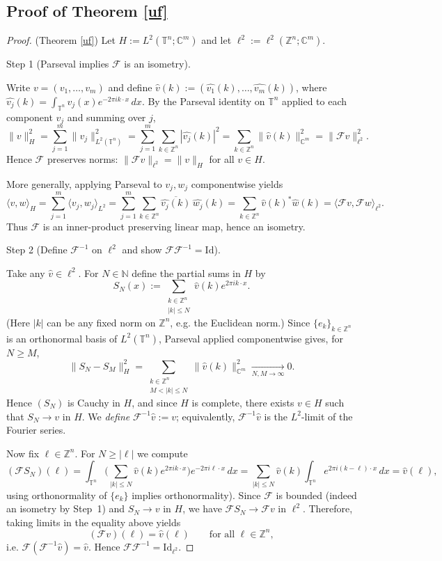 \documentclass{article}
\theoremstyle{plain}
\theoremstyle{definition}
\theoremstyle{remark}
\newcommand{\inner}[2]{\langle #1, #2 \rangle}
\newcommand{\F}{\mathcal{F}}
\newcommand{\Finve}{\mathcal{F}^{-1}}
\begin{document}
\subsection{Proof of Theorem \ref{uf}}
\begin{proof}(Theorem \ref{uf})
Let $H:=L^2(\mathbb{T}^n;\mathbb{C}^m)$ and let $\ell^2:=\ell^2(\mathbb{Z}^n;\mathbb{C}^m)$.

\medskip
Step 1 (Parseval implies $\F$ is an isometry).

Write $v=(v_1,\dots,v_m)$ and define $\hat v(k):=(\widehat{v_1}(k),\dots,\widehat{v_m}(k))$,
where $\widehat{v_j}(k)=\int_{\mathbb{T}^n} v_j(x)e^{-2\pi i k\cdot x}\,dx$.
By the Parseval identity on $\mathbb{T}^n$ applied to each component $v_j$ and summing over $j$,
\[
\|v\|_{H}^2
=\sum_{j=1}^m \|v_j\|_{L^2(\mathbb{T}^n)}^2
=\sum_{j=1}^m \sum_{k\in\mathbb{Z}^n} |\widehat{v_j}(k)|^2
=\sum_{k\in\mathbb{Z}^n}\|\hat v(k)\|_{\mathbb{C}^m}^2
=\|\F v\|_{\ell^2}^2.
\]
Hence $\F$ preserves norms: $\|\F v\|_{\ell^2}=\|v\|_{H}$ for all $v\in H$.

More generally, applying Parseval to $v_j,w_j$ componentwise yields
\[
\inner{v}{w}_{H}
=\sum_{j=1}^m \inner{v_j}{w_j}_{L^2}
=\sum_{j=1}^m\sum_{k\in\mathbb{Z}^n}\overline{\widehat{v_j}(k)}\,\widehat{w_j}(k)
=\sum_{k\in\mathbb{Z}^n}\hat v(k)^*\hat w(k)
=\inner{\F v}{\F w}_{\ell^2}.
\]
Thus $\F$ is an inner-product preserving linear map, hence an isometry.


Step 2 (Define $\Finve$ on $\ell^2$ and show $\F\Finve=\mathrm{Id}$).

Take any $\hat v\in \ell^2$. For $N\in\mathbb{N}$ define the partial sums in $H$ by
\[
S_N(x):=\sum_{\substack{k\in\mathbb{Z}^n\\ |k|\le N}}\hat v(k)e^{2\pi i k\cdot x}.
\]
(Here $|k|$ can be any fixed norm on $\mathbb{Z}^n$, e.g. the Euclidean norm.)
Since $\{e_k\}_{k\in\mathbb{Z}^n}$ is an orthonormal basis of $L^2(\mathbb{T}^n)$, Parseval applied componentwise gives, for $N\ge M$,
\[
\|S_N-S_M\|_{H}^2
=\sum_{\substack{k\in\mathbb{Z}^n\\ M<|k|\le N}}\|\hat v(k)\|_{\mathbb{C}^m}^2
\xrightarrow[N,M\to\infty]{}0.
\]
Hence $(S_N)$ is Cauchy in $H$, and since $H$ is complete, there exists $v\in H$ such that
$S_N\to v$ in $H$.
We \emph{define} $\Finve\hat v:=v$; equivalently, $\Finve\hat v$ is the $L^2$-limit of the Fourier series.

Now fix $\ell\in\mathbb{Z}^n$. For $N\ge |\ell|$ we compute
\[
(\F S_N)(\ell)
=\int_{\mathbb{T}^n}\Big(\sum_{|k|\le N}\hat v(k)e^{2\pi i k\cdot x}\Big)e^{-2\pi i \ell\cdot x}\,dx
=\sum_{|k|\le N}\hat v(k)\int_{\mathbb{T}^n}e^{2\pi i (k-\ell)\cdot x}\,dx
=\hat v(\ell),
\]
using orthonormality of $\{e_k\}$ implies orthonormality).
Since $\F$ is bounded (indeed an isometry by Step~1) and $S_N\to v$ in $H$, we have
$\F S_N\to \F v$ in $\ell^2$. Therefore, taking limits in the equality above yields
\[
(\F v)(\ell)=\hat v(\ell)\qquad\text{for all }\ell\in\mathbb{Z}^n,
\]
i.e. $\F(\Finve \hat v)=\hat v$. Hence $\F\Finve=\mathrm{Id}_{\ell^2}$.


\end{proof}
\end{document}
